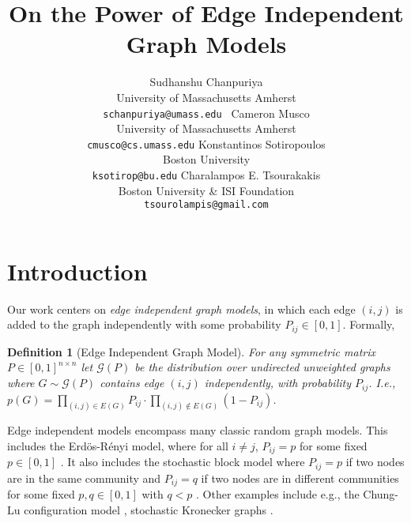 \documentclass{article}
\title{On the Power of Edge Independent Graph Models}
\author{
	Sudhanshu Chanpuriya \\ University of Massachusetts Amherst \\ \texttt{schanpuriya@umass.edu }
	\And 
	Cameron Musco\\ University of Massachusetts Amherst\\ \texttt{cmusco@cs.umass.edu}
	\AND
	Konstantinos Sotiropoulos\\ Boston University\\ \texttt{ksotirop@bu.edu} 
	\And
	Charalampos E. Tsourakakis\\ Boston University \& ISI Foundation \\ \texttt{tsourolampis@gmail.com} 
}
\newtheorem{definition}{Definition}
\begin{document}
\maketitle




\section{Introduction}
\label{sec:intro}

Our work centers on \emph{edge independent graph models}, in which each edge $(i,j)$ is added to the graph independently with some probability $P_{ij} \in [0,1]$. Formally,
\begin{definition}[Edge Independent Graph Model]\label{def:ei}
For any symmetric matrix $P \in [0,1]^{n \times n}$ let $\mathcal{G}(P)$ be the distribution over undirected unweighted graphs where $G \sim  \mathcal{G}(P)$ contains edge $(i,j)$ independently, with probability $P_{ij}$. I.e., $p(G) = \prod_{(i,j) \in E(G)} P_{ij} \cdot \prod_{(i,j) \notin E(G)} (1-P_{ij})$.
\end{definition}

Edge independent models encompass many  classic random graph models. This includes the Erd\"{o}s-R\'{e}nyi  model, where for all $i \neq j$, $P_{ij} = p$ for  some fixed $p \in [0,1]$ \cite{ErdosRenyi:1960}. It also includes the stochastic block model where $P_{ij} = p$ if two nodes are in the same community and $P_{ij} = q$ if two nodes are in different communities for some fixed $p,q \in [0,1]$ with $q < p$ \cite{SnijdersNowicki:1997}. Other examples include e.g., the Chung-Lu configuration model \cite{ChungLu:2002}, stochastic Kronecker graphs \cite{LeskovecChakrabartiKleinberg:2010}.
\end{document}
